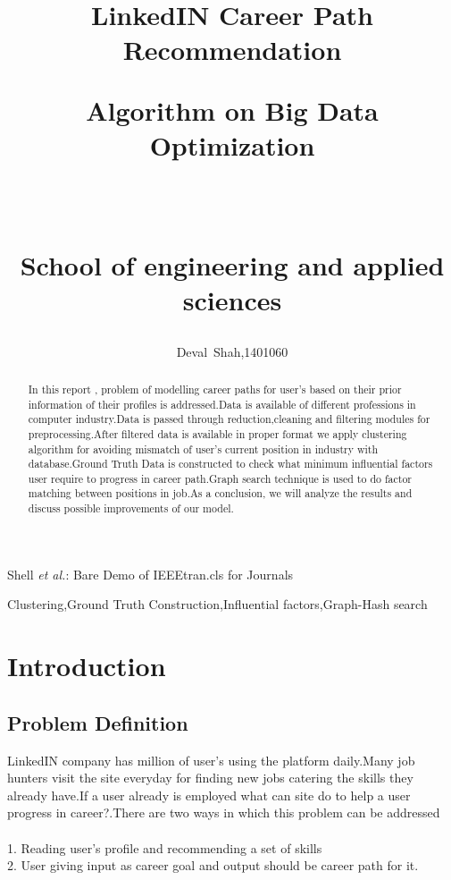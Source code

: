 \documentclass[journal]{IEEEtran}
\begin{document}
\title{ LinkedIN Career Path Recommendation\\
\begin{large} 
  \textbf{Algorithm on Big Data Optimization}
\end{large}
\\
\begin{large} 
  \textbf{School of engineering and applied sciences}
\end{large} 
}


\author{Deval~Shah,{1401060}}%


%
{Shell \MakeLowercase{\textit{et al.}}: Bare Demo of IEEEtran.cls for Journals}




\maketitle


\begin{abstract}
In this report , problem of modelling career paths for user's based on their prior information of their profiles is addressed.Data is available of different professions in computer industry.Data is passed through reduction,cleaning and filtering modules for preprocessing.After filtered data is available in proper format we apply clustering algorithm for avoiding mismatch of user's current position in industry with database.Ground Truth Data is constructed to check what minimum influential factors user require to progress in career path.Graph search technique is used to do factor matching between positions in job.As a conclusion, we will analyze the results and discuss possible improvements of our model. 
\end{abstract}

\begin{IEEEkeywords}
Clustering,Ground Truth Construction,Influential factors,Graph-Hash search
\end{IEEEkeywords}


\section{\textbf{Introduction}}
\subsection{\textbf{Problem Definition}}
LinkedIN company has million of user's using the platform daily.Many job hunters visit the site everyday for finding new jobs catering the skills they already have.If a user already is employed what can site do to help a user progress in career?.There are two ways in which this problem can be addressed 
\\
\\1. Reading user's profile and recommending a set of skills
\\2. User giving input as career goal and output should be career path for it.
\end{document}
